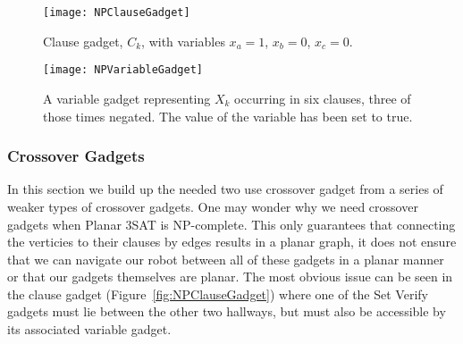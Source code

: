 \begin{figure}[!ht]
\begin{minipage}{.36\textwidth}
    \texttt{[image: NPClauseGadget]}
    \caption{Clause gadget, $C_k$, with variables $x_a=1$, $x_b=0$, $x_c=0$.}
    \label{fig:NPClauseGadget}
\end{minipage}
\hspace{5mm}
\begin{minipage}{.57\textwidth}
  \centering
    \texttt{[image: NPVariableGadget]}
    \caption{A variable gadget representing $X_k$ occurring in six clauses, three of those times negated. The value of the variable has been set to true.}
    \label{fig:NPVariableGadget}
\end{minipage}
\end{figure}

%

\subsubsection{Crossover Gadgets}
\label{sec:NPCrossover}
In this section we build up the needed two use crossover gadget from a series of weaker types of crossover gadgets. One may wonder why we need crossover gadgets when Planar 3SAT is NP-complete. This only guarantees that connecting the verticies to their clauses by edges results in a planar graph, it does not ensure that we can navigate our robot between all of these gadgets in a planar manner or that our gadgets themselves are planar. The most obvious issue can be seen in the clause gadget (Figure~\ref{fig:NPClauseGadget}) where one of the Set Verify gadgets must lie between the other two hallways, but must also be accessible by its associated variable gadget.

